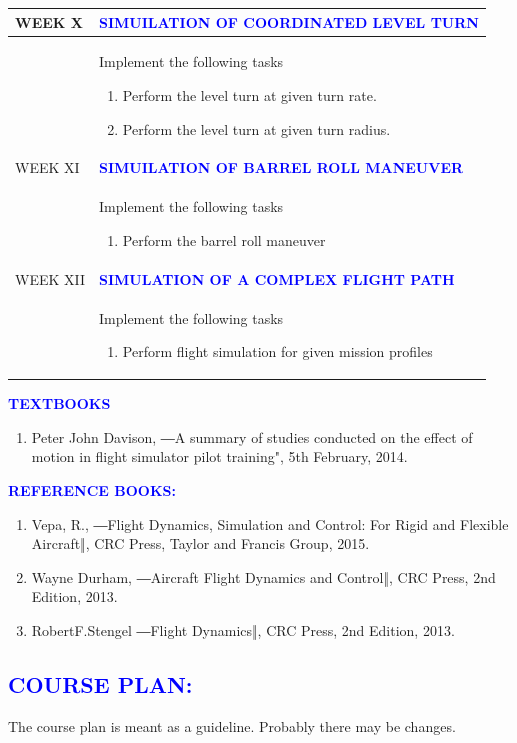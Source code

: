 \documentclass[11pt]{exam}
\begin{document}
\begin{longtable}{|>{\centering\arraybackslash}p{2cm}  | >{\raggedright\arraybackslash}p{14cm}  | }
	WEEK X & \textcolor{blue}{\textbf{SIMUILATION OF COORDINATED LEVEL TURN}}\\
	\hline
	&Implement the following tasks
\begin{enumerate}
	\item Perform the level turn at given turn rate.
\item Perform the level turn at given turn radius.
\end{enumerate}	
	\\
	\hline
	WEEK XI & \textcolor{blue}{\textbf{SIMUILATION OF BARREL ROLL MANEUVER}}\\
	\hline
	& Implement the following tasks 
	\begin{enumerate}
	\item Perform the barrel roll maneuver
\end{enumerate}	
	\\
	\hline
	WEEK XII & \textcolor{blue}{\textbf{SIMULATION OF A COMPLEX FLIGHT PATH}}\\
	\hline
	&Implement the following tasks
	\begin{enumerate}
	\item Perform flight simulation for given mission profiles
\end{enumerate}	
	\\
	\hline
	
\end{longtable}
\raggedright	\textcolor{blue}{\textbf{TEXTBOOKS}}\\
\begin{enumerate}
	\item	Peter John Davison, ―A summary of studies conducted on the effect of motion in flight simulator pilot training", 5th February, 2014.


\end{enumerate}
	
  \textcolor{blue}{\textbf{REFERENCE BOOKS:}}\\
\begin{enumerate}
	\vspace{-0.5cm}
	\item Vepa, R., ―Flight Dynamics, Simulation and Control: For Rigid and Flexible Aircraft‖, CRC Press, Taylor and Francis Group, 2015.
\item Wayne Durham, ―Aircraft Flight Dynamics and Control‖, CRC Press, 2nd Edition, 2013.
\item RobertF.Stengel ―Flight Dynamics‖, CRC Press, 2nd Edition, 2013.
\end{enumerate}
\newpage
\vspace{-1cm} 
\textcolor{blue}{\section{\large \bfseries	COURSE PLAN:}}\vspace{-0.4cm}
The course plan is meant as a guideline. Probably there may be changes.
\end{document}
